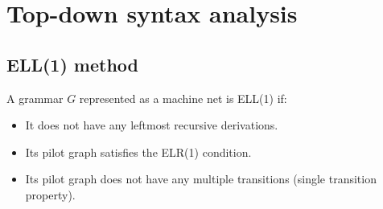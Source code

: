 \section{Top-down syntax analysis}

\subsection*{ELL(1) method}
A grammar $G$ represented as a machine net is ELL(1) if: 
\begin{itemize}
    \item It does not have any leftmost recursive derivations. 
    \item Its pilot graph satisfies the ELR(1) condition. 
    \item Its pilot graph does not have any multiple transitions (single transition property). 
\end{itemize}

